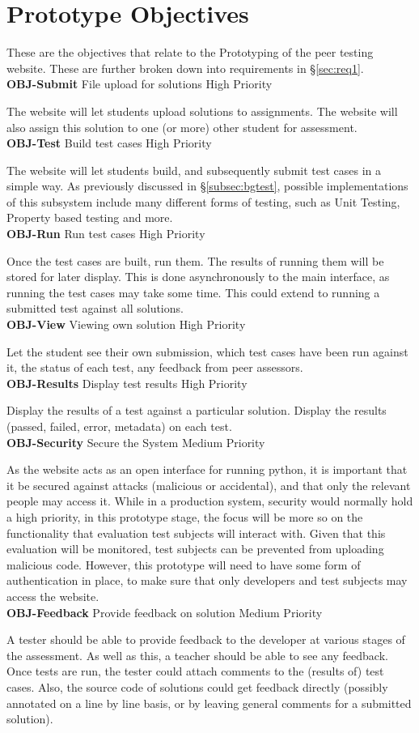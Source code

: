 \documentclass[a4paper,11pt]{report}
\newcommand{\objitem}[4]{\textbf{\\OBJ-#1} \quad #2 \hfill #3\par#4}
\begin{document}
\section{Prototype Objectives}
\label{sec:proto-obj}
These are the objectives that relate to the Prototyping of the peer testing website. These are further broken down into requirements in \S\ref{sec:req1}.
\objitem{Submit}{File upload for solutions}{High Priority}{The website will let students upload solutions to assignments. The website will also assign this solution to one (or more) other student for assessment.}
\objitem{Test}{Build test cases}{High Priority}{The website will let students build, and subsequently submit test cases in a simple way. As previously discussed in \S\ref{subsec:bgtest}, possible implementations of this subsystem include many different forms of testing, such as Unit Testing, Property based testing and more.}
\objitem{Run}{Run test cases}{High Priority}{Once the test cases are built, run them. The results of running them will be stored for later display. This is done asynchronously to the main interface, as running the test cases may take some time. This could extend to running a submitted test against all solutions.}
\objitem{View}{Viewing own solution}{High Priority}{Let the student see their own submission, which test cases have been run against it, the status of each test, any feedback from peer assessors.}
\objitem{Results}{Display test results}{High Priority}{Display the results of a test against a particular solution. Display the results (passed, failed, error, metadata) on each test.}
\objitem{Security}{Secure the System}{Medium Priority}{As the website acts as an open interface for running python, it is important that it be secured against attacks (malicious or accidental), and that only the relevant people may access it. While in a production system, security would normally hold a high priority, in this prototype stage, the focus will be more so on the functionality that evaluation test subjects will interact with. Given that this evaluation will be monitored, test subjects can be prevented from uploading malicious code. However, this prototype will need to have some form of authentication in place, to make sure that only developers and test subjects may access the website.}
\objitem{Feedback}{Provide feedback on solution}{Medium Priority}{A tester should be able to provide feedback to the developer at various stages of the assessment. As well as this, a teacher should be able to see any feedback. Once tests are run, the tester could attach comments to the (results of) test cases. Also, the source code of solutions could get feedback directly (possibly annotated on a line by line basis, or by leaving general comments for a submitted solution).}
\end{document}
